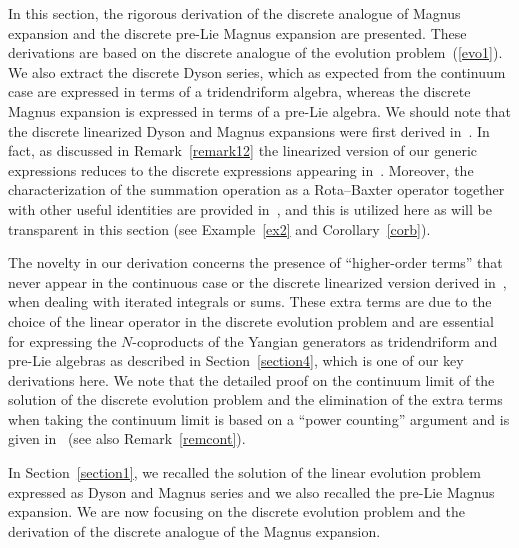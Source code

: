 \documentclass[10pt,a4paper]{amsart}
\numberwithin{equation}{section}
\theoremstyle{definition}
\begin{document}
In this section, the rigorous derivation of the discrete analogue of Magnus expansion and the discrete pre-Lie Magnus expansion are presented. These derivations are based on the discrete analogue of the evolution problem~(\ref{evo1}). We also extract the discrete Dyson series, which as expected from the continuum case are expressed in terms of a tridendriform {algebra}, whereas the discrete Magnus expansion is expressed in terms of a pre-Lie algebra. We should note that the discrete linearized Dyson and Magnus expansions were first derived in~\cite{EbraMan}. In fact, as discussed in Remark~\ref{remark12} the linearized version of our generic expressions reduces to the discrete expressions appearing in~\cite{EbraMan}. Moreover, the characterization of the summation operation as a Rota--Baxter operator together with other useful identities are provided in~\cite{EbraMan}, and this is utilized here as will be transparent in this section ({see Example~\ref{ex2} and Corollary~\ref{corb}}).

The novelty in our derivation concerns the presence of ``higher-order terms'' that never appear in the continuous case or the discrete linearized version derived in~\cite{EbraMan}, when dealing with iterated integrals or sums. These extra terms are due to the choice of the linear operator in the discrete evolution problem and are essential for expressing the $N$-coproducts of the Yangian generators as tridendriform and pre-Lie algebras as described in Section~\ref{section4}, which is one of our key derivations here.
We note that the detailed proof on the continuum
limit of the solution of the discrete evolution problem and the elimination of the extra terms when taking the continuum limit is based on a ``power counting'' argument and is given in~\cite{AvanDoikouSfetsos} (see also Remark~\ref{remcont}).

In Section~\ref{section1}, we recalled the solution of the linear evolution problem expressed as Dyson and Magnus series and we also recalled the pre-Lie Magnus expansion. We are now focusing on the discrete evolution problem and the derivation of the discrete analogue of the Magnus expansion.
\end{document}
